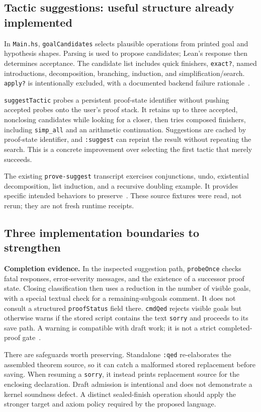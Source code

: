 \documentclass[11pt,letterpaper]{article}
\newcommand{\code}[1]{\nolinkurl{#1}}
\begin{document}
\subsection{Tactic suggestions: useful structure already implemented}
In \code{Main.hs}, \code{goalCandidates} selects plausible operations from printed
goal and hypothesis shapes. Parsing is used to propose candidates; Lean's response
then determines acceptance. The candidate list includes quick finishers,
\code{exact?}, named introductions, decomposition, branching, induction, and
simplification/search. \code{apply?} is intentionally excluded, with a documented
backend failure rationale~\cite{l-main}.

\code{suggestTactic} probes a persistent proof-state identifier without pushing
accepted probes onto the user's proof stack. It retains up to three accepted, nonclosing
candidates while looking for a closer, then tries composed finishers, including
\code{simp_all} and an arithmetic continuation. Suggestions are cached by proof-state
identifier, and \code{:suggest} can reprint the result without repeating the search.
This is a concrete improvement over selecting the first tactic that merely succeeds.

The existing \code{prove-suggest} transcript exercises conjunctions, undo, existential
decomposition, list induction, and a recursive doubling example. It provides
specific intended behaviors to preserve~\cite{l-tests}. These source fixtures were
read, not rerun; they are not fresh runtime receipts.

\subsection{Three implementation boundaries to strengthen}
\textbf{Completion evidence.} In the inspected suggestion path,
\code{probeOnce} checks fatal responses, error-severity messages, and the existence
of a successor proof state. Closing classification then uses a reduction in the
number of visible goals, with a special textual check for a remaining-subgoals
comment. It does not consult a structured \code{proofStatus} field there.
\code{cmdQed} rejects visible goals but otherwise warns if the stored script
contains the text \code{sorry} and proceeds to its save path. A warning is compatible
with draft work; it is not a strict completed-proof gate~\cite{l-main}.

There are safeguards worth preserving. Standalone \code{:qed} re-elaborates the
assembled theorem source, so it can catch a malformed stored replacement before
saving. When resuming a \code{sorry}, it instead prints replacement source for the
enclosing declaration. Draft admission is intentional and does not demonstrate a
kernel soundness defect. A distinct sealed-finish operation should apply the
stronger target and axiom policy required by the proposed language.
\end{document}
